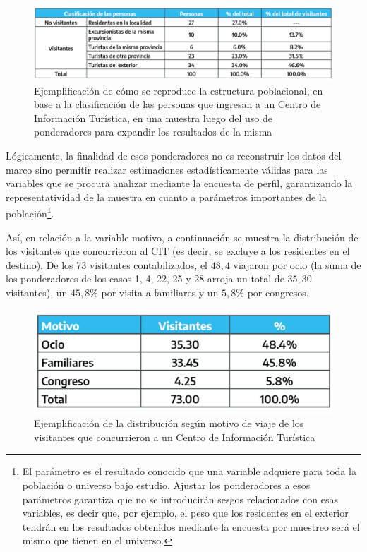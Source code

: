 \documentclass[
]{book}
\begin{document}
\begin{figure}

{\centering \includegraphics[width=1\linewidth]{imagenes/tabla_3} 

}

\caption{Ejemplificación de cómo se reproduce la estructura poblacional, en base a la clasificación de las personas que ingresan a un Centro de Información Turística, en una muestra luego del uso de ponderadores para expandir los resultados de la misma}\label{fig:Clasificaciondepersonas}
\end{figure}

Lógicamente, la finalidad de esos ponderadores no es reconstruir los datos del marco sino permitir realizar estimaciones estadísticamente válidas para las variables que se procura analizar mediante la encuesta de perfil, garantizando la representatividad de la muestra en cuanto a parámetros importantes de la población\footnote{El parámetro es el resultado conocido que una variable adquiere para toda la población o universo bajo estudio. Ajustar los ponderadores a esos parámetros garantiza que no se introducirán sesgos relacionados con esas variables, es decir que, por ejemplo, el peso que los residentes en el exterior tendrán en los resultados obtenidos mediante la encuesta por muestreo será el mismo que tienen en el universo.}.

Así, en relación a la variable motivo, a continuación se muestra la distribución de los visitantes que concurrieron al CIT (es decir, se excluye a los residentes en el destino). De los 73 visitantes contabilizados, el \(48,4%
\) viajaron por ocio (la suma de los ponderadores de los casos 1, 4, 22, 25 y 28 arroja un total de \(35,30\) visitantes), un \(45,8\%\) por visita a familiares y un \(5,8\%\) por congresos.

\begin{figure}

{\centering \includegraphics[width=1\linewidth]{imagenes/tabla_a4} 

}

\caption{Ejemplificación de la distribución según motivo de viaje de los visitantes que concurrieron a un Centro de Información Turística}\label{fig:Motivo}
\end{figure}
\end{document}
